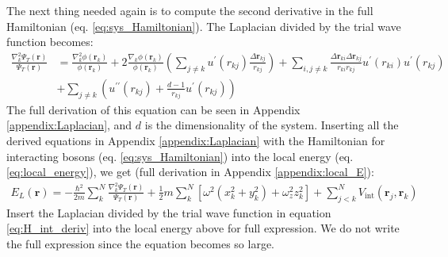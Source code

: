 \documentclass[12pt,a4paper,english]{article}
\begin{document}
The next thing needed again is to compute the second derivative in the full Hamiltonian (eq. \ref{eq:sys_Hamiltonian}). The Laplacian divided by the trial wave function becomes:
\begin{align}
\label{eq:Laplacian_int}
\frac{\nabla_k^2\Psi_T(\textbf{r})}{\Psi_T(\textbf{r})}&= \frac{\nabla_k^2\phi(\textbf{r}_k)}{\phi(\textbf{r}_k)}+2\frac{\nabla_k\phi(\textbf{r}_k)}{\phi(\textbf{r}_k)}\left(\sum_{j\neq k}u^{\prime}(r_{kj})\frac{\Delta\textbf{r}_{kj}}{r_{kj}}\right)+\sum_{i,j\neq k}\frac{\Delta \textbf{r}_{ki}\Delta \textbf{r}_{kj}}{r_{ki}r_{kj}}u^{\prime}(r_{ki})u^{\prime}(r_{kj})\nonumber\\
&+\sum_{j\neq k}\left(u^{\prime\prime}(r_{kj})+\frac{d-1}{r_{kj}}u^{\prime}(r_{kj})\right)
\end{align}
The full derivation of this equation can be seen in Appendix \ref{appendix:Laplacian}, and $d$ is the dimensionality of the system. 
Inserting all the derived equations in Appendix \ref{appendix:Laplacian} with the Hamiltonian for interacting bosons (eq. \ref{eq:sys_Hamiltonian}) into the local energy (eq. \ref{eq:local_energy}), we get (full derivation in Appendix \ref{appendix:local_E}):
\begin{align}
\label{eq:local_E_full}
E_L(\textbf{r})=-\frac{\hbar^2}{2m}\sum_k^N\frac{\nabla_k^2\Psi_T(\textbf{r})}{\Psi_T(\textbf{r})}
+\frac{1}{2}m\sum_k^N[\omega^2(x_k^2+y_k^2) + \omega_z^2z_k^2]
+\sum_{j<k}^{N}V_{\text{int}}(\textbf{r}_j,\textbf{r}_k)
\end{align}
Insert the Laplacian divided by the trial wave function in equation \ref{eq:H_int_deriv} into the local energy above for full expression. We do not write the full expression since the equation becomes so large.
\end{document}
